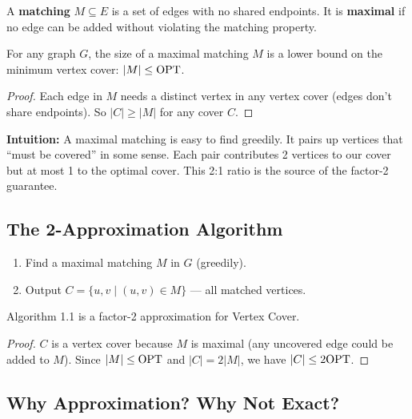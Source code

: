 \begin{definition}[Matching]
A \textbf{matching} $M \subseteq E$ is a set of edges with no shared endpoints. It is \textbf{maximal} if no edge can be added without violating the matching property.
\end{definition}

\begin{lemma}
For any graph $G$, the size of a maximal matching $M$ is a lower bound on the minimum vertex cover: $|M| \leq \mathrm{OPT}$.
\end{lemma}
\begin{proof}
Each edge in $M$ needs a distinct vertex in any vertex cover (edges don't share endpoints). So $|C| \geq |M|$ for any cover $C$.
\end{proof}

\begin{intuitionbox}
\textbf{Intuition:} A maximal matching is easy to find greedily. It pairs up vertices that ``must be covered'' in some sense. Each pair contributes 2 vertices to our cover but at most 1 to the optimal cover. This 2:1 ratio is the source of the factor-2 guarantee.
\end{intuitionbox}

\subsection{The 2-Approximation Algorithm}

\begin{algorithmdef}
\begin{enumerate}
    \item Find a maximal matching $M$ in $G$ (greedily).
    \item Output $C = \{u, v \mid (u,v) \in M\}$ — all matched vertices.
\end{enumerate}
\end{algorithmdef}

\begin{theorem}
Algorithm 1.1 is a factor-2 approximation for Vertex Cover.
\end{theorem}
\begin{proof}
$C$ is a vertex cover because $M$ is maximal (any uncovered edge could be added to $M$). Since $|M| \leq \mathrm{OPT}$ and $|C| = 2|M|$, we have $|C| \leq 2\mathrm{OPT}$.
\end{proof}

\subsection{Why Approximation? Why Not Exact?}

